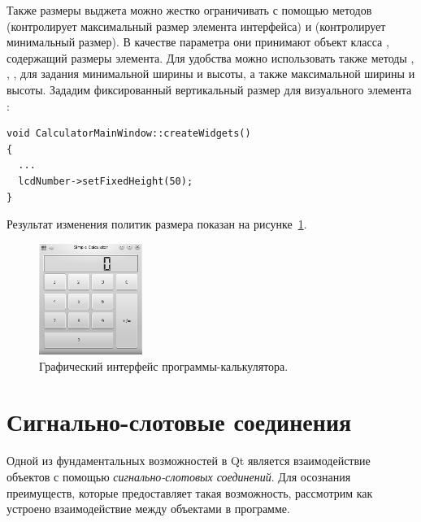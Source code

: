 Также размеры выджета можно жестко ограничивать с помощью методов
 (контролирует максимальный размер элемента интерфейса) и 
(контролирует минимальный размер). В качестве параметра они принимают объект класса ,
содержащий размеры элемента. Для удобства можно использовать также методы ,
, ,  для задания минимальной ширины и
высоты, а также максимальной ширины и высоты. Зададим фиксированный вертикальный размер для визуального элемента
:
\begin{lstlisting}
void CalculatorMainWindow::createWidgets()
{
  ...
  lcdNumber->setFixedHeight(50);
}
\end{lstlisting}

Результат изменения политик размера показан на рисунке~\ref{ch13:refDrawing5}.
\begin{figure}[htb]
\begin{center}
\includegraphics[width=0.3\textwidth]{img/ris_13_6}
\caption{Графический интерфейс программы-калькулятора.}
\label{ch13:refDrawing5}
\end{center}
\end{figure}

\section[Сигнально-слотовые соединения]{Сигнально-слотовые соединения}
Одной из фундаментальных возможностей в Qt является взаимодействие объектов с помощью \emph{сигнально-слотовых
соединений}. Для осознания преимуществ, которые предоставляет такая  возможность, рассмотрим как устроено
взаимодействие между объектами в программе.

